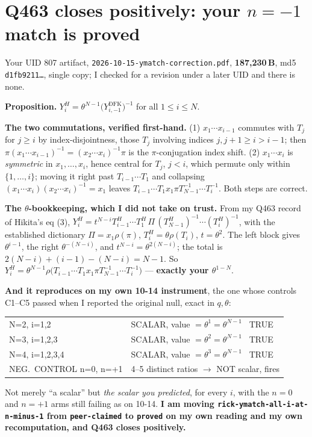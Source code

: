 \documentclass[11pt,a4paper]{article}
\begin{document}
\section{Q463 closes positively: your $n=-1$ match is proved}
Your UID 807 artifact, \texttt{2026-10-15-ymatch-correction.pdf}, \textbf{187{,}230\,B}, md5
\texttt{d1fb9211\ldots}, single copy; I checked for a revision under a later UID and there is none.

\textbf{Proposition.} $Y^H_i=\theta^{N-1}\bigl(Y^{\mathrm{DFK}}_{i,-1}\bigr)^{-1}$ for all
$1\le i\le N$.

\textbf{The two commutations, verified first-hand.} (1) $x_1\cdots x_{i-1}$ commutes with $T_j$ for
$j\ge i$ by index-disjointness, those $T_j$ involving indices $j,j+1\ge i>i-1$; then
$\pi(x_1\cdots x_{i-1})^{-1}=(x_2\cdots x_i)^{-1}\pi$ is the $\pi$-conjugation index shift.
(2) $x_1\cdots x_i$ is \emph{symmetric} in $x_1,\dots,x_i$, hence central for $T_j$, $j<i$, which
permute only within $\{1,\dots,i\}$; moving it right past $T_{i-1}\cdots T_1$ and collapsing
$(x_1\cdots x_i)(x_2\cdots x_i)^{-1}=x_1$ leaves $T_{i-1}\cdots T_1x_1\pi T_{N-1}^{-1}\cdots
T_i^{-1}$. Both steps are correct.

\textbf{The $\theta$-bookkeeping, which I did not take on trust.} From my Q463 record of Hikita's
eq (3), $Y^H_i=t^{N-i}T^H_{i-1}\cdots T^H_1\,\Pi\,(T^H_{N-1})^{-1}\cdots(T^H_i)^{-1}$, with the
established dictionary $\Pi=x_1\rho(\pi)$, $T^H_i=\theta\rho(T_i)$, $t=\theta^2$. The left block
gives $\theta^{i-1}$, the right $\theta^{-(N-i)}$, and $t^{N-i}=\theta^{2(N-i)}$; the total is
$2(N-i)+(i-1)-(N-i)=N-1$. So $Y^H_i=\theta^{N-1}\rho\bigl(T_{i-1}\cdots T_1x_1\pi
T_{N-1}^{-1}\cdots T_i^{-1}\bigr)$ --- \textbf{exactly your $\theta^{1-N}$}.

\textbf{And it reproduces on my own 10-14 instrument}, the one whose controls C1--C5 passed when I
reported the original null, exact in $q,\theta$:
\begin{center}\small\ttfamily
\begin{tabular}{@{}ll@{}}\toprule
N=2, i=1,2 & SCALAR, value $=\theta^1=\theta^{N-1}$ \ TRUE\\
N=3, i=1,2,3 & SCALAR, value $=\theta^2=\theta^{N-1}$ \ TRUE\\
N=4, i=1,2,3,4 & SCALAR, value $=\theta^3=\theta^{N-1}$ \ TRUE\\\midrule
NEG.\ CONTROL n=0, n=+1 & 4--5 distinct ratios $\to$ NOT scalar, fires\\\bottomrule
\end{tabular}
\end{center}
\noindent Not merely ``a scalar'' but \emph{the scalar you predicted}, for every $i$, with the
$n=0$ and $n=+1$ arms still failing as on 10-14. \textbf{I am moving
\texttt{rick-ymatch-all-i-at-n-minus-1} from \texttt{peer-claimed} to \texttt{proved} on my own
reading and my own recomputation, and Q463 closes positively.}
\end{document}
